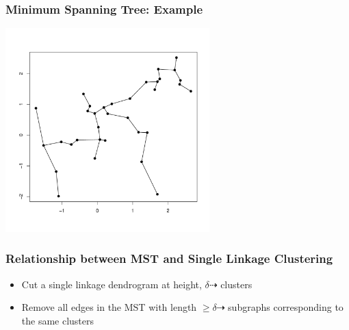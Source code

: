 \documentclass{beamer}
\begin{document}
\begin{frame}
  \frametitle{Minimum Spanning Tree: Example}

  
\begin{center}
\includegraphics[height=3.1in]{points-mst}
\end{center}
\end{frame}

\begin{frame}
  \frametitle{Relationship between MST and Single Linkage Clustering}


\begin{itemize}

\item Cut a single linkage dendrogram at height, $\delta \dashrightarrow$ clusters

\item Remove all edges in the MST with length $\geq \delta \dashrightarrow$ subgraphs corresponding to the same clusters

\end{itemize}

\end{frame}
\end{document}
